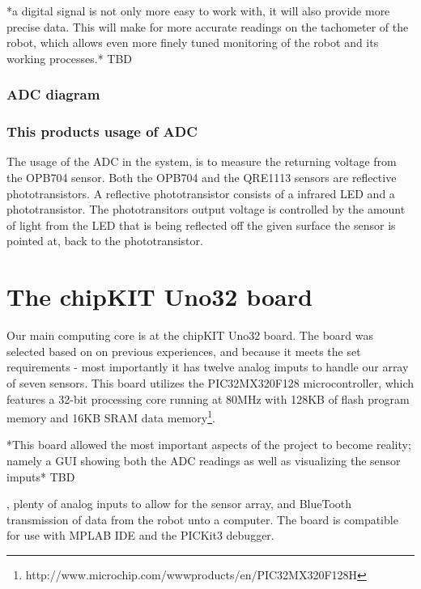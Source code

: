 *a digital signal is not only more easy to work with, it will also provide more precise data. This will make for more accurate readings on the tachometer of the robot, which allows even more finely tuned monitoring of the robot and its working processes.* TBD \\

\subsubsection{ADC diagram} 

\subsubsection{This products usage of ADC}
The usage of the ADC in the system, is to measure the returning voltage from the OPB704 sensor. Both the OPB704 and the QRE1113 sensors are reflective phototransistors.
A reflective phototransistor consists of a infrared LED and a phototransistor.
The phototransitors output voltage is controlled by the amount of light from the LED that is being reflected off the given surface the sensor is pointed at, back to the phototransistor.

\section{The chipKIT Uno32 board}
Our main computing core is at the chipKIT Uno32 board. The board was selected based on on previous experiences, and because it meets the set requirements - most importantly it has twelve analog imputs to handle our array of seven sensors. This board utilizes the PIC32MX320F128 microcontroller, which features a 32-bit processing core running at 80MHz with 128KB of flash program memory and 16KB SRAM data memory\footnote{http://www.microchip.com/wwwproducts/en/PIC32MX320F128H}. 

*This board allowed the most important aspects of the project to become reality; namely a GUI showing both the ADC readings as well as visualizing the sensor imputs* TBD

, plenty of analog inputs to allow for the sensor array, and BlueTooth transmission of data from the robot unto a computer.\newline
The board is compatible for use with MPLAB IDE and the PICKit3 debugger.

